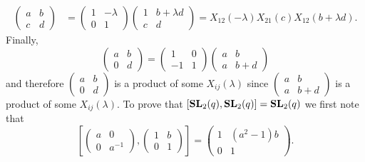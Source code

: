 \begin{align*}
\begin{pmatrix}
a&b\\
c&d	
\end{pmatrix}
&=\begin{pmatrix}
1&-\lambda\\
0&1	
\end{pmatrix}
\begin{pmatrix}
1&b+\lambda d\\
c&d	
\end{pmatrix}
=X_{12}(-\lambda)X_{21}(c)X_{12}(b+\lambda d).
\end{align*}
Finally, 
\[
\begin{pmatrix}
	a&b\\
	0&d
\end{pmatrix}
=\begin{pmatrix}
	1&0\\
	-1&1
\end{pmatrix}
\begin{pmatrix}
	a&b\\
	a&b+d
\end{pmatrix}
\]
and therefore $\begin{pmatrix}
	a&b\\
	0&d
\end{pmatrix}$ is a product of some $X_{ij}(\lambda)$ since
$\begin{pmatrix}
a&b\\
a&b+d	
\end{pmatrix}$ 
is a product of some $X_{ij}(\lambda)$. 
To prove that $[\mathbf{SL}_2(q),\mathbf{SL}_2(q)]=\mathbf{SL}_2(q)$ we first 
note that
\[
\left[\begin{pmatrix}a&0\\0&a^{-1}\end{pmatrix},\begin{pmatrix}1&b\\0&1\end{pmatrix}\right]
=\begin{pmatrix}
1 & (a^2-1)b\\
0 & 1
\end{pmatrix}.
\]	

